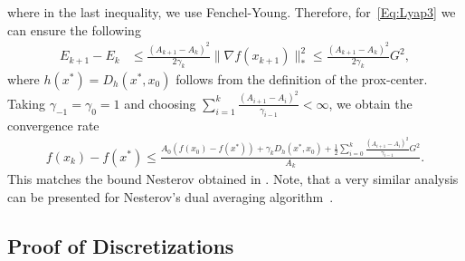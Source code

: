 \documentclass[11pt]{article}
\theoremstyle{plain}
\begin{document}
where in the last inequality, we use Fenchel-Young. Therefore, for~\eqref{Eq:Lyap3} we can ensure the following
\begin{align*}
E_{k+1} - E_k & \leq \frac{(A_{k+1} - A_k)^2}{2\gamma_{k}} \|\nabla f(x_{k+1})\|_\ast^2\leq   \frac{(A_{k+1} - A_k)^2}{2\gamma_{k}} G^2,
\end{align*}
where $h(x^\ast) = D_h(x^\ast, x_0)$ follows from the definition of the prox-center. Taking $\gamma_{-1} = \gamma_0 = 1$ and choosing $\sum_{i=1}^k \frac{(A_{i+1} - A_i)^2}{\gamma_{i-1}}  < \infty$, we obtain the convergence rate 
\begin{align*}
f(x_k) - f(x^\ast) \leq \frac{A_0(f(x_0) - f(x^\ast)) +  \gamma_k D_h(x^\ast , x_0) +\frac{1}{2}\sum_{i=0}^{k}\frac{(A_{i+1} - A_i)^2}{\gamma_{i-1}}G^2}{A_k}.
\end{align*}
This matches the bound Nesterov obtained in \cite{Nesterov15}. Note, that a very similar analysis can be presented for Nesterov's dual averaging algorithm~\cite{Nesterov09}.

\subsection{Proof of Discretizations}
\label{App:OtherDiscret}
\end{document}

